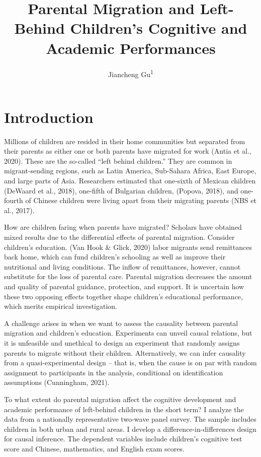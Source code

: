 \documentclass[
  man,floatsintext]{apa7}
\title{Parental Migration and Left-Behind Children's Cognitive and Academic Performances}
\author{Jiancheng Gu\textsuperscript{1}}
\date{}
\affiliation{\vspace{0.5cm}\textsuperscript{1} Faculty of Social Sciences, Vrije Universiteit Amsterdam}
\begin{document}
\maketitle

\hypertarget{introduction}{%
\section{Introduction}\label{introduction}}

Millions of children are resided in their home communities but separated from their parents as either one or both parents have migrated for work (Antia et al., 2020). These are the so-called ``left behind children.'' They are common in migrant-sending regions, such as Latin America, Sub-Sahara Africa, East Europe, and large parts of Asia. Researchers estimated that one-sixth of Mexican children (DeWaard et al., 2018), one-fifth of Bulgarian children, (Popova, 2018), and one-fourth of Chinese children were living apart from their migrating parents (NBS et al., 2017).

How are children faring when parents have migrated? Scholars have obtained mixed results due to the differential effects of parental migration. Consider children's education. (Van Hook \& Glick, 2020) labor migrants send remittances back home, which can fund children's schooling as well as improve their nutritional and living conditions. The inflow of remittances, however, cannot substitute for the loss of parental care. Parental migration decreases the amount and quality of parental guidance, protection, and support. It is uncertain how these two opposing effects together shape children's educational performance, which merits empirical investigation.

A challenge arises in when we want to assess the causality between parental migration and children's education. Experiments can unveil causal relations, but it is unfeasible and unethical to design an experiment that randomly assigns parents to migrate without their children. Alternatively, we can infer causality from a quasi-experimental design -- that is, when the cause is on par with random assignment to participants in the analysis, conditional on identification assumptions (Cunningham, 2021).

To what extent do parental migration affect the cognitive development and academic performance of left-behind children in the short term? I analyze the data from a nationally representative two-wave panel survey. The sample includes children in both urban and rural areas. I develop a difference-in-differences design for causal inference. The dependent variables include children's cognitive test score and Chinese, mathematics, and English exam scores.
\end{document}
